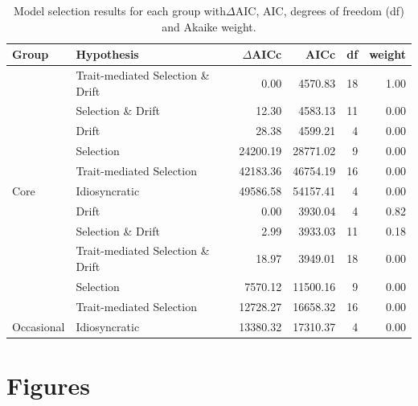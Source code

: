 \documentclass[12pt]{article}
\begin{document}
\begin{table}[]
    \caption{Model selection results for each group with$\Delta$AIC, AIC, degrees of freedom (df) and Akaike weight.}


\begin{tabular}{llrrrr}
\toprule
\textbf{Group} &\textbf{Hypothesis} & \textbf{$\Delta$AICc} & \textbf{AICc} & \textbf{df}& \textbf{weight}\\
\hline
 & Trait-mediated Selection \& Drift & 0.00 & 4570.83 & 18 & 1.00\\

 & Selection \& Drift & 12.30 & 4583.13 & 11 & 0.00\\

 & Drift & 28.38 & 4599.21 & 4 & 0.00\\

 & Selection & 24200.19 & 28771.02 & 9 & 0.00\\

 & Trait-mediated Selection & 42183.36 & 46754.19 & 16 & 0.00\\

\multirow{-6}{*}{\raggedright\arraybackslash Core} & Idiosyncratic & 49586.58 & 54157.41 & 4 & 0.00\\
\cline{1-6}
 & Drift & 0.00 & 3930.04 & 4 & 0.82\\

 & Selection \& Drift & 2.99 & 3933.03 & 11 & 0.18\\

 & Trait-mediated Selection \& Drift & 18.97 & 3949.01 & 18 & 0.00\\

 & Selection & 7570.12 & 11500.16 & 9 & 0.00\\

 & Trait-mediated Selection & 12728.27 & 16658.32 & 16 & 0.00\\

\multirow{-6}{*}{\raggedright\arraybackslash Occasional} & Idiosyncratic & 13380.32 & 17310.37 & 4 & 0.00\\

\bottomrule
\end{tabular}
\label{tab:aic_tab}
\end{table}

\clearpage

\section*{Figures}
\end{document}
